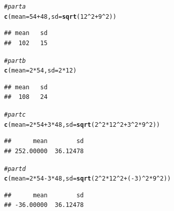 \documentclass[twoside]{book}\usepackage[]{graphicx}\usepackage[]{xcolor}
\makeatletter
\newcommand{\hlnum}[1]{\textcolor[rgb]{0.686,0.059,0.569}{#1}}%
\newcommand{\hlcom}[1]{\textcolor[rgb]{0.678,0.584,0.686}{\textit{#1}}}%
\newcommand{\hlopt}[1]{\textcolor[rgb]{0,0,0}{#1}}%
\newcommand{\hlstd}[1]{\textcolor[rgb]{0.345,0.345,0.345}{#1}}%
\newcommand{\hlkwc}[1]{\textcolor[rgb]{0.333,0.667,0.333}{#1}}%
\newcommand{\hlkwd}[1]{\textcolor[rgb]{0.737,0.353,0.396}{\textbf{#1}}}%
\newenvironment{kframe}{%
 \def\at@end@of@kframe{}%
 \ifinner\ifhmode%
  \def\at@end@of@kframe{\end{minipage}}%
  \begin{minipage}{\columnwidth}%
 \fi\fi%
 \def\FrameCommand##1{\hskip\@totalleftmargin \hskip-\fboxsep
 \colorbox{shadecolor}{##1}\hskip-\fboxsep
     \hskip-\linewidth \hskip-\@totalleftmargin \hskip\columnwidth}%
 \MakeFramed {\advance\hsize-\width
   \@totalleftmargin\z@ \linewidth\hsize
   \@setminipage}}%
 {\par\unskip\endMakeFramed%
 \at@end@of@kframe}
\newenvironment{knitrout}{}{} %
\makeatother
\begin{document}
\begin{solution}
\begin{knitrout}
\color{fgcolor}\begin{kframe}
\begin{alltt}
\hlcom{# part a}
\hlkwd{c}\hlstd{(}\hlkwc{mean} \hlstd{=} \hlnum{54} \hlopt{+} \hlnum{48}\hlstd{,} \hlkwc{sd} \hlstd{=} \hlkwd{sqrt}\hlstd{(}\hlnum{12}\hlopt{^}\hlnum{2} \hlopt{+} \hlnum{9}\hlopt{^}\hlnum{2}\hlstd{))}
\end{alltt}
\begin{verbatim}
## mean   sd 
##  102   15
\end{verbatim}
\begin{alltt}
\hlcom{# part b}
\hlkwd{c}\hlstd{(}\hlkwc{mean} \hlstd{=} \hlnum{2} \hlopt{*} \hlnum{54}\hlstd{,} \hlkwc{sd} \hlstd{=} \hlnum{2} \hlopt{*} \hlnum{12}\hlstd{)}
\end{alltt}
\begin{verbatim}
## mean   sd 
##  108   24
\end{verbatim}
\begin{alltt}
\hlcom{# part c}
\hlkwd{c}\hlstd{(}\hlkwc{mean} \hlstd{=} \hlnum{2} \hlopt{*} \hlnum{54} \hlopt{+} \hlnum{3} \hlopt{*} \hlnum{48}\hlstd{,} \hlkwc{sd} \hlstd{=} \hlkwd{sqrt}\hlstd{(}\hlnum{2}\hlopt{^}\hlnum{2} \hlopt{*} \hlnum{12}\hlopt{^}\hlnum{2} \hlopt{+} \hlnum{3}\hlopt{^}\hlnum{2} \hlopt{*} \hlnum{9}\hlopt{^}\hlnum{2}\hlstd{))}
\end{alltt}
\begin{verbatim}
##      mean        sd 
## 252.00000  36.12478
\end{verbatim}
\begin{alltt}
\hlcom{# part d}
\hlkwd{c}\hlstd{(}\hlkwc{mean} \hlstd{=} \hlnum{2} \hlopt{*} \hlnum{54} \hlopt{-} \hlnum{3} \hlopt{*} \hlnum{48}\hlstd{,} \hlkwc{sd} \hlstd{=} \hlkwd{sqrt}\hlstd{(}\hlnum{2}\hlopt{^}\hlnum{2} \hlopt{*} \hlnum{12}\hlopt{^}\hlnum{2} \hlopt{+} \hlstd{(}\hlopt{-}\hlnum{3}\hlstd{)}\hlopt{^}\hlnum{2} \hlopt{*} \hlnum{9}\hlopt{^}\hlnum{2}\hlstd{))}
\end{alltt}
\begin{verbatim}
##      mean        sd 
## -36.00000  36.12478
\end{verbatim}
\end{kframe}
\end{knitrout}
\end{solution}
\end{document}

